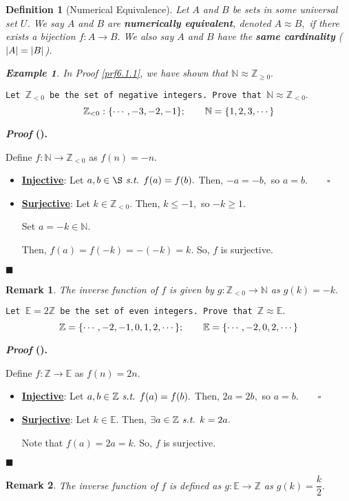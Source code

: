 \documentclass[12pt,a4paper]{article}
\newtheorem{df}{Definition}[subsection]
\newtheorem{eg}{Example}[subsection]
\newcounter{nprf}[subsection]
\newtheorem*{rmk}{\indent Remark}
\newenvironment*{prf}{\par\indent\textbf{\textit{Proof} (\stepcounter{nprf}\thenprf). }\par }{\par\hfill $\blacksquare$\par}
\def\Z{{\mathbb{Z}}}
\def\N{{\mathbb{N}}}
\def\E{{\mathbb{E}}}
\def\st{\emph{ s.t. }}
\begin{document}
\begin{df}[Numerical Equivalence]
	Let $A$ and $B$ be sets in some universal set $U$. We say $A$ and $B$ are \textbf{numerically equivalent}, denoted $A\approx B,$ if there exists a bijection $f:A\to B.$ We also say $A$ and $B$ have the \textbf{same cardinality} ($\qty|A|=\qty|B|$).
	\begin{eg}In Proof \ref{prf6.1.1}, we have shown that $\N\approx\Z_{\geq0}.$\end{eg}
\end{df}
\begin{framed}
\noindent\texttt{Let $\Z_{<0}$ be the set of negative integers. Prove that $\N\approx\Z_{<0}.$}	
\[\Z_{<0}:\qty{\cdots,-3,-2,-1};\qquad\N=\qty{1,2,3,\cdots}\]
\begin{prf}
	Define $f:\N\to\Z_{<0}$ as $f(n)=-n.$\begin{itemize}
		\item \textbf{\underline{Injective}}: Let $a,b\in\S\st f(a)=f(b).$ Then, $-a=-b,$ so $a=b.\qquad\square$
		\item \textbf{\underline{Surjective}}: Let $k\in\Z_{<0}.$ Then, $k\leq-1,$ so $-k\geq1.$\par Set $a=-k\in\N.$\par Then, $f(a)=f(-k)=-(-k)=k.$ So, $f$ is surjective. 
	\end{itemize}
\end{prf}
\begin{rmk} The inverse function of $f$ is given by $g:\Z_{<0}\to\N$ as $g(k)=-k.$	\end{rmk}
\end{framed}
\begin{framed}
\noindent\texttt{Let $\E=2\Z$ be the set of even integers. Prove that $\Z\approx\E.$}
\[\Z=\qty{\cdots,-2,-1,0,1,2,\cdots};\qquad\E=\qty{\cdots,-2,0,2,\cdots}\]
\begin{prf}\label{prf6.1.3}
	Define $f:\Z\to\E$ as $f(n)=2n.$\begin{itemize}
		\item \textbf{\underline{Injective}}: Let $a,b\in\Z\st f(a)=f(b).$ Then, $2a=2b,$ so $a=b.\qquad\square$
		\item \textbf{\underline{Surjective}}: Let $k\in\E.$ Then, $\exists a\in\Z\st k=2a.$\par Note that $f(a)=2a=k.$ So, $f$ is surjective.
	\end{itemize}	
\end{prf}
\begin{rmk} The inverse function of $f$ is defined as $g:\E\to\Z$ as $g(k)=\dfrac{k}{2}.$\end{rmk}
\end{framed}
\end{document}
